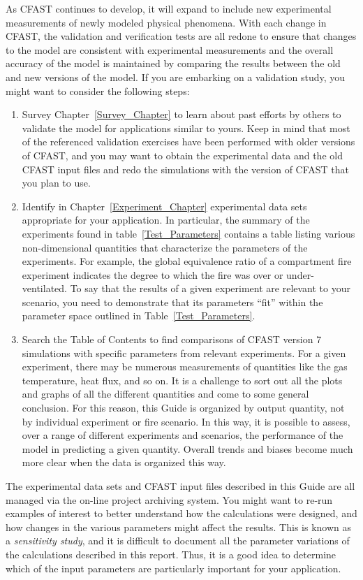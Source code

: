 As CFAST continues to develop, it will expand to include new experimental measurements of newly modeled physical phenomena. With each change in CFAST, the validation and verification tests are all redone to ensure that changes to the model are consistent with experimental measurements and the overall accuracy of the model is maintained by comparing the results between the old and new versions of the model. If you are embarking on a validation study, you might want to consider the following steps:
\begin{enumerate}
\item Survey Chapter~\ref{Survey_Chapter} to learn about past efforts by others to validate the model for applications similar to yours. Keep in mind that most of the referenced validation exercises have been performed with older versions of CFAST, and you may want to obtain the experimental data and the old CFAST input files and redo the simulations with the version of CFAST that you plan to use.
\item Identify in Chapter~\ref{Experiment_Chapter} experimental data sets appropriate for your application. In particular, the summary of the experiments found in table~\ref{Test_Parameters} contains a table listing various non-dimensional quantities that characterize the parameters of the experiments. For example, the global equivalence ratio of a compartment fire experiment indicates the degree to which the fire was over or under-ventilated. To say that the results of a given experiment are relevant to your scenario, you need to demonstrate that its parameters ``fit'' within the parameter space outlined in Table~\ref{Test_Parameters}.
\item Search the Table of Contents to find comparisons of CFAST version 7 simulations with specific parameters from relevant experiments. For a given experiment, there may be numerous measurements of quantities like the gas temperature, heat flux, and so on. It is a challenge to sort out all the plots and graphs of all the different quantities and come to some general conclusion. For this reason, this Guide is organized by output quantity, not by individual experiment or fire scenario. In this way, it is possible to assess, over a range of different experiments and scenarios, the performance of the model in predicting a given quantity. Overall trends and biases become much more clear when the data is organized this way.
\end{enumerate}
The experimental data sets and CFAST input files described in this Guide are all managed via the on-line project archiving system. You might want to re-run examples of interest to better understand how the calculations were designed, and how changes in the various parameters might affect the results. This is known as a {\em sensitivity study}, and it is difficult to document all the parameter variations of the calculations described in this report. Thus, it is a good idea to determine which of the input parameters are particularly important for your application.








